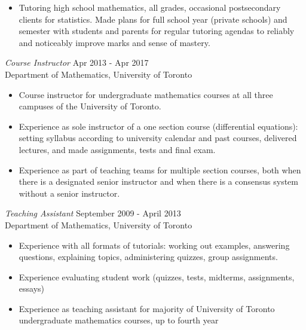 \documentclass[margin, 10pt]{res} %
\begin{document}
\begin{resume}
\begin{itemize} \itemsep -2pt %
\item Tutoring high school mathematics, all grades, occasional postsecondary clients for statistics. Made plans for full school year (private schools) and semester with students and parents for regular tutoring agendas to reliably and noticeably improve marks and sense of mastery. 
\end{itemize}

{\sl Course Instructor} \hfill Apr 2013 - Apr 2017 \\
Department of Mathematics, University of Toronto

\begin{itemize} \itemsep -2pt %
\item Course instructor for undergraduate mathematics courses at all three campuses of the University of Toronto.

\item Experience as sole instructor of a one section course (differential equations): setting syllabus according to university calendar and past courses, delivered lectures, and made assignments, tests and final exam.

\item Experience as part of teaching teams for multiple section courses, both when there is a designated senior instructor and when there is a consensus system without a senior instructor.

\end{itemize}
 
{\sl Teaching Assistant} \hfill September 2009 - April 2013 \\
Department of Mathematics, University of Toronto

\begin{itemize} 
\item Experience with all formats of tutorials: working out examples, answering questions, explaining topics, administering quizzes, group assignments.
\item Experience evaluating student work (quizzes, tests, midterms, assignments, essays)
\item Experience as teaching assistant for majority of University of Toronto undergraduate mathematics courses, up to fourth year
\end{itemize} 



\end{resume}
\end{document}
